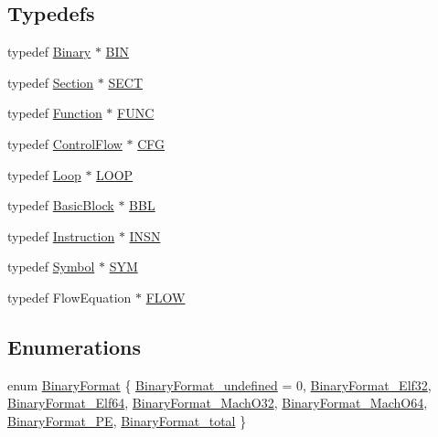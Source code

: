\subsection*{\-Typedefs}
\begin{DoxyCompactItemize}
\item 
typedef \hyperlink{class_e_p_a_x_1_1_binary}{\-Binary} $\ast$ \hyperlink{namespace_e_p_a_x_ad71db9d891528e4a8b303787dff8ac0b}{\-B\-I\-N}
\item 
typedef \hyperlink{class_e_p_a_x_1_1_section}{\-Section} $\ast$ \hyperlink{namespace_e_p_a_x_a6c4fe59392073737d60d4b99f37ba154}{\-S\-E\-C\-T}
\item 
typedef \hyperlink{class_e_p_a_x_1_1_function}{\-Function} $\ast$ \hyperlink{namespace_e_p_a_x_a5b05cc89d633ec2241cb3af828c03024}{\-F\-U\-N\-C}
\item 
typedef \hyperlink{class_e_p_a_x_1_1_control_flow}{\-Control\-Flow} $\ast$ \hyperlink{namespace_e_p_a_x_a6edfef502c4f06240ec12097855e17dd}{\-C\-F\-G}
\item 
typedef \hyperlink{class_e_p_a_x_1_1_loop}{\-Loop} $\ast$ \hyperlink{namespace_e_p_a_x_ac236645423e99e8ccc784040ff1f881e}{\-L\-O\-O\-P}
\item 
typedef \hyperlink{class_e_p_a_x_1_1_basic_block}{\-Basic\-Block} $\ast$ \hyperlink{namespace_e_p_a_x_a0ad4f6573b03fa5c375bed0e68d4fab0}{\-B\-B\-L}
\item 
typedef \hyperlink{class_e_p_a_x_1_1_instruction}{\-Instruction} $\ast$ \hyperlink{namespace_e_p_a_x_a601da5f2ead9a877d566da6cfc9026eb}{\-I\-N\-S\-N}
\item 
typedef \hyperlink{class_e_p_a_x_1_1_symbol}{\-Symbol} $\ast$ \hyperlink{namespace_e_p_a_x_acad75cfc5d20dbf9de18b17dfe451b42}{\-S\-Y\-M}
\item 
typedef \-Flow\-Equation $\ast$ \hyperlink{namespace_e_p_a_x_a289a37f4d34ed51ee92cbd8c601db421}{\-F\-L\-O\-W}
\end{DoxyCompactItemize}
\subsection*{\-Enumerations}
\begin{DoxyCompactItemize}
\item 
enum \hyperlink{namespace_e_p_a_x_a4be639c006ef14def4708b37ee6dd67d}{\-Binary\-Format} \{ \*
\hyperlink{namespace_e_p_a_x_a4be639c006ef14def4708b37ee6dd67da3182433e867539e77037333d404acc33}{\-Binary\-Format\-\_\-undefined} =  0, 
\hyperlink{namespace_e_p_a_x_a4be639c006ef14def4708b37ee6dd67daf60db782258907c0e3454e681be52862}{\-Binary\-Format\-\_\-\-Elf32}, 
\hyperlink{namespace_e_p_a_x_a4be639c006ef14def4708b37ee6dd67dad53669d0075b37070148384d8e265711}{\-Binary\-Format\-\_\-\-Elf64}, 
\hyperlink{namespace_e_p_a_x_a4be639c006ef14def4708b37ee6dd67daff850adc3def047f2845b81403253a55}{\-Binary\-Format\-\_\-\-Mach\-O32}, 
\*
\hyperlink{namespace_e_p_a_x_a4be639c006ef14def4708b37ee6dd67da21aab72c33c950664305259647addd2e}{\-Binary\-Format\-\_\-\-Mach\-O64}, 
\hyperlink{namespace_e_p_a_x_a4be639c006ef14def4708b37ee6dd67dae60e7b8f7668c532959c02a911c74d4b}{\-Binary\-Format\-\_\-\-P\-E}, 
\hyperlink{namespace_e_p_a_x_a4be639c006ef14def4708b37ee6dd67da45985e8a809b9a9fb3bbee4f74cb4c01}{\-Binary\-Format\-\_\-total}
 \}
\end{DoxyCompactItemize}
